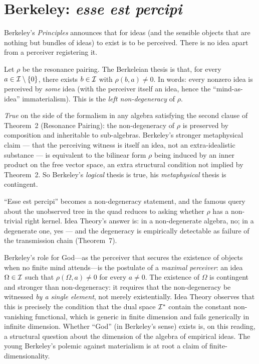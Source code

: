 \section{Berkeley: \emph{esse est percipi}}\label{sec:berkeley}

 Berkeley's \emph{Principles}
\cite{Berkeley1710} announces that for ideas (and the sensible objects
that are nothing but bundles of ideas) to exist is to be perceived. There
is no idea apart from a perceiver registering it.

\formalclaim Let $\rho$ be the resonance pairing. The Berkeleian thesis
is that, for every $a\in\mathcal{I}\setminus\{0\}$, there exists $b\in\mathcal{I}$
with $\rho(b,a)\neq 0$. In words: every nonzero idea is perceived by
\emph{some} idea (with the perceiver itself an idea, hence the
``mind-as-idea'' immaterialism). This is the \emph{left non-degeneracy}
of $\rho$.

\formalstatus \emph{True} on the side of the formalism in any algebra
satisfying the second clause of Theorem~2 (Resonance Pairing): the
non-degeneracy of $\rho$ is preserved by composition and inheritable to
sub-algebras. Berkeley's stronger metaphysical claim ---
that the perceiving witness is itself an idea, not an extra-idealistic
substance --- is equivalent to the bilinear form $\rho$ being induced by
an inner product on the free vector space, an extra structural condition
not implied by Theorem~2. So Berkeley's \emph{logical} thesis is true,
his \emph{metaphysical} thesis is contingent.

\litcomment ``Esse est percipi'' becomes a non-degeneracy statement, and
the famous query about the unobserved tree in the quad reduces to
asking whether $\rho$ has a non-trivial right kernel. Idea Theory's
answer is: in a non-degenerate algebra, no; in a degenerate one, yes ---
and the degeneracy is empirically detectable as failure of the
transmission chain (Theorem~7).

Berkeley's role for God---as the perceiver that secures the existence
of objects when no finite mind attends---is the postulate of a
\emph{maximal perceiver}: an idea $\Omega\in\mathcal{I}$ such that
$\rho(\Omega, a)\neq 0$ for every $a\neq 0$. The existence of $\Omega$
is contingent and stronger than non-degeneracy: it requires that the
non-degeneracy be witnessed \emph{by a single element}, not merely
existentially. Idea Theory observes that this is precisely the
condition that the dual space $\mathcal{I}^*$ contain the constant
non-vanishing functional, which is generic in finite dimension and
fails generically in infinite dimension. Whether ``God'' (in
Berkeley's sense) exists is, on this reading, a structural question
about the dimension of the algebra of empirical ideas. The young
Berkeley's polemic against materialism is at root a claim of
finite-dimensionality.

